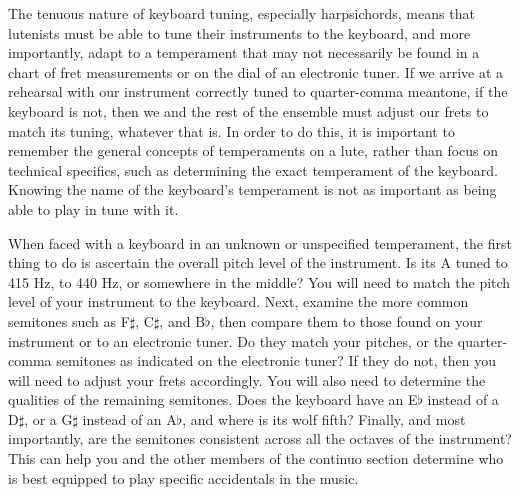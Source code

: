 The tenuous nature of keyboard tuning, especially harpsichords, means that lutenists must be able to tune their instruments
to the keyboard, and more importantly, adapt to a temperament that may not necessarily be found
in a chart of fret measurements or on the dial of an electronic tuner.  If we arrive at a rehearsal
with our instrument correctly tuned to quarter-comma meantone, if the keyboard is not, then
we and the rest of the ensemble must adjust our frets to match its tuning, whatever that is.
In order to do this, it is important to remember the general concepts of temperaments on a lute,
rather than focus on technical specifics, such as determining the exact temperament of the 
keyboard.  Knowing the name of the keyboard's temperament is not as important as being able to
play in tune with it.

When faced with a keyboard in an unknown or unspecified temperament, the first thing to do is
ascertain the overall pitch level of the instrument.  Is its A tuned to 415 Hz, to 440 Hz, or
somewhere in the middle?  You will need to match the pitch level of your instrument to the keyboard.
Next, examine the more common semitones such as F$\sharp$, C$\sharp$, and B$\flat$, then compare
them to those found on your instrument or to an electronic tuner.  Do they match your pitches, or
the quarter-comma semitones as indicated on the electronic tuner?  If they do not, then you will
need to adjust your frets accordingly.  You will also need to determine the qualities of the
remaining semitones.  Does the keyboard have an E$\flat$ instead of a D$\sharp$, or a G$\sharp$
instead of an A$\flat$, and where is its wolf fifth?  Finally, and most importantly, are the
semitones consistent across all the octaves of the instrument?  This can help you and the other
members of the continuo section determine who is best equipped to play specific accidentals in the
music.

